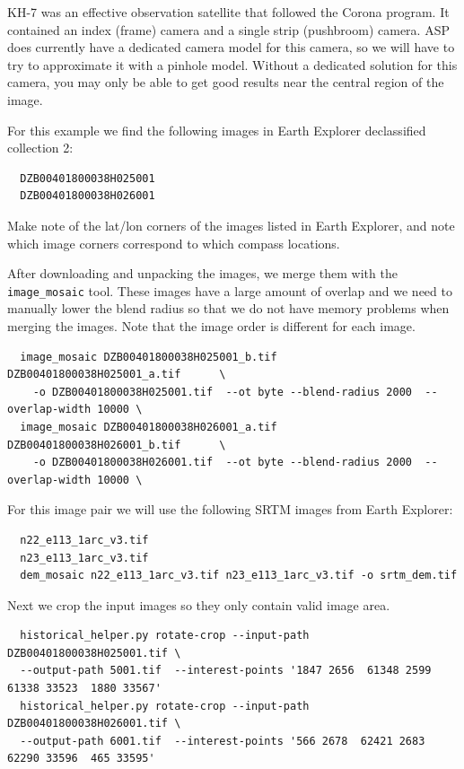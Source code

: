 KH-7 was an effective observation satellite that followed the Corona program.
It contained an index (frame) camera and a single strip (pushbroom) camera.
ASP does currently have a dedicated camera model for this camera, so we will
have to try to approximate it with a pinhole model.  Without a dedicated solution
for this camera, you may only be able to get good results near the central region
of the image.

For this example we find the following images in Earth Explorer declassified collection 2:
\begin{verbatim}
  DZB00401800038H025001
  DZB00401800038H026001
\end{verbatim}

Make note of the lat/lon corners of the images listed in Earth Explorer, and note which
image corners correspond to which compass locations.

After downloading and unpacking the images, we merge them with the \texttt{image\_mosaic} tool.
These images have a large amount of overlap and we need to manually lower the blend radius so
that we do not have memory problems when merging the images.  Note that the image order is 
different for each image.

\begin{verbatim}
  image_mosaic DZB00401800038H025001_b.tif  DZB00401800038H025001_a.tif      \
    -o DZB00401800038H025001.tif  --ot byte --blend-radius 2000  --overlap-width 10000 \
  image_mosaic DZB00401800038H026001_a.tif  DZB00401800038H026001_b.tif      \
    -o DZB00401800038H026001.tif  --ot byte --blend-radius 2000  --overlap-width 10000 \
\end{verbatim}

For this image pair we will use the following SRTM images from Earth Explorer:

\begin{verbatim}
  n22_e113_1arc_v3.tif
  n23_e113_1arc_v3.tif
  dem_mosaic n22_e113_1arc_v3.tif n23_e113_1arc_v3.tif -o srtm_dem.tif
\end{verbatim}

Next we crop the input images so they only contain valid image area.

\begin{verbatim}
  historical_helper.py rotate-crop --input-path DZB00401800038H025001.tif \
  --output-path 5001.tif  --interest-points '1847 2656  61348 2599  61338 33523  1880 33567'
  historical_helper.py rotate-crop --input-path DZB00401800038H026001.tif \
  --output-path 6001.tif  --interest-points '566 2678  62421 2683  62290 33596  465 33595'
\end{verbatim}


